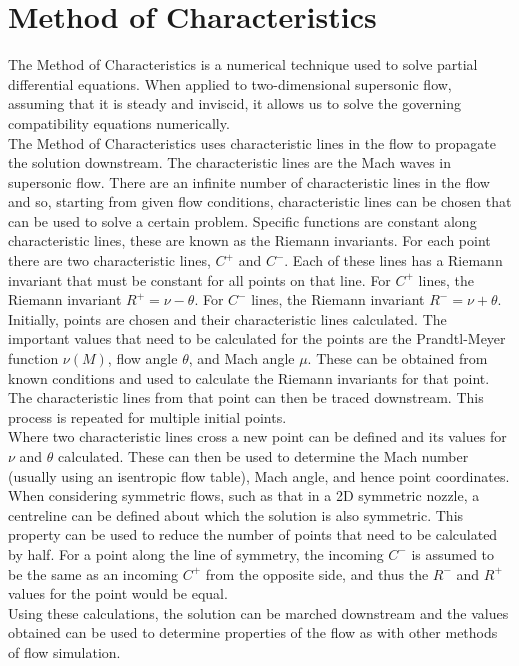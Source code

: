 \documentclass[10pt,a4paper]{article}
\author{Elijah Andrews}
\begin{document}
\section{Method of Characteristics}
The Method of Characteristics is a numerical technique used to solve partial differential equations. When applied to two-dimensional supersonic flow, assuming that it is steady and inviscid, it allows us to solve the governing compatibility equations numerically.
\\The Method of Characteristics uses characteristic lines in the flow to propagate the solution downstream. The characteristic lines are the Mach waves in supersonic flow. There are an infinite number of characteristic lines in the flow and so, starting from given flow conditions, characteristic lines can be chosen that can be used to solve a certain problem. Specific functions are constant along characteristic lines, these are known as the Riemann invariants.
For each point there are two characteristic lines, $C^{+}$ and $C^{-}$. Each of these lines has a Riemann invariant that must be constant for all points on that line. For $C^{+}$ lines, the Riemann invariant $R^{+} = \nu - \theta$. For $C^{-}$ lines, the Riemann invariant $R^{-} = \nu + \theta$.
\\Initially, points are chosen and their characteristic lines calculated. The important values that need to be calculated for the points are the Prandtl-Meyer function $\nu(M)$, flow angle $\theta$, and Mach angle $\mu$. These can be obtained from known conditions and used to calculate the Riemann invariants for that point. The characteristic lines from that point can then be traced downstream. This process is repeated for multiple initial points.
\\Where two characteristic lines cross a new point can be defined and its values for $\nu$ and $\theta$ calculated. These can then be used to determine the Mach number (usually using an isentropic flow table), Mach angle, and hence point coordinates.
\\When considering symmetric flows, such as that in a 2D symmetric nozzle, a centreline can be defined about which the solution is also symmetric. This property can be used to reduce the number of points that need to be calculated by half. For a point along the line of symmetry, the incoming $C^{-}$ is assumed to be the same as an incoming $C^{+}$ from the opposite side, and thus the $R^{-}$ and $R^{+}$ values for the point would be equal.
\\Using these calculations, the solution can be marched downstream and the values obtained can be used to determine properties of the flow as with other methods of flow simulation.
\end{document}
